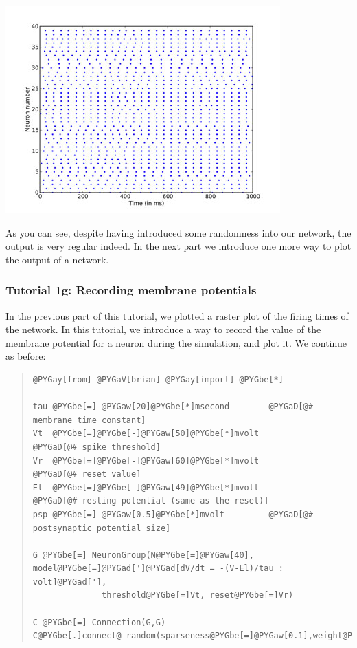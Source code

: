 \documentclass[letterpaper,10pt,english]{manual}
\begin{document}
\includegraphics{1f.jpg}

As you can see, despite having introduced some randomness into
our network, the output is very regular indeed. In the next part
we introduce one more way to plot the output of a network.

\resetcurrentobjects


\subsubsection{Tutorial 1g: Recording membrane potentials}

In the previous part of this tutorial, we plotted a raster plot of
the firing times of the network. In this tutorial, we introduce
a way to record the value of the membrane potential for a neuron
during the simulation, and plot it. We continue as before:
\begin{quote}

\begin{Verbatim}[commandchars=@\[\]]
@PYGay[from] @PYGaV[brian] @PYGay[import] @PYGbe[*]

tau @PYGbe[=] @PYGaw[20]@PYGbe[*]msecond        @PYGaD[@# membrane time constant]
Vt  @PYGbe[=]@PYGbe[-]@PYGaw[50]@PYGbe[*]mvolt          @PYGaD[@# spike threshold]
Vr  @PYGbe[=]@PYGbe[-]@PYGaw[60]@PYGbe[*]mvolt          @PYGaD[@# reset value]
El  @PYGbe[=]@PYGbe[-]@PYGaw[49]@PYGbe[*]mvolt          @PYGaD[@# resting potential (same as the reset)]
psp @PYGbe[=] @PYGaw[0.5]@PYGbe[*]mvolt         @PYGaD[@# postsynaptic potential size]

G @PYGbe[=] NeuronGroup(N@PYGbe[=]@PYGaw[40], model@PYGbe[=]@PYGad[']@PYGad[dV/dt = -(V-El)/tau : volt]@PYGad['],
              threshold@PYGbe[=]Vt, reset@PYGbe[=]Vr)

C @PYGbe[=] Connection(G,G)
C@PYGbe[.]connect@_random(sparseness@PYGbe[=]@PYGaw[0.1],weight@PYGbe[=]psp)
\end{Verbatim}
\end{quote}
\end{document}
